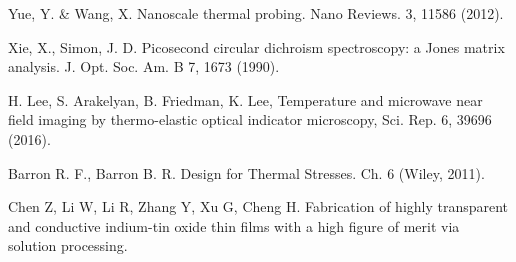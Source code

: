 \documentclass[12pt, fleqn]{report}
\begin{document}
\renewcommand{\bibname}{Գրականություն}
\begin{thebibliography}{9}

Yue, Y. \& Wang, X. Nanoscale thermal probing. Nano Reviews. 3, 11586 (2012).

Xie, X., Simon, J. D. Picosecond circular dichroism spectroscopy: a Jones matrix
analysis. J. Opt. Soc. Am. B 7, 1673 (1990).

H. Lee, S. Arakelyan, B. Friedman, K. Lee, Temperature and microwave near field imaging by thermo-elastic optical indicator microscopy, Sci. Rep. 6, 39696 (2016).

 Barron R. F., Barron B. R. Design for Thermal Stresses. Ch. 6 (Wiley, 2011).

 Chen Z, Li W, Li R, Zhang Y, Xu G, Cheng H. Fabrication of highly transparent and conductive indium-tin oxide thin films with a high figure of merit via solution processing.
\end{thebibliography}


   
\end{document}
